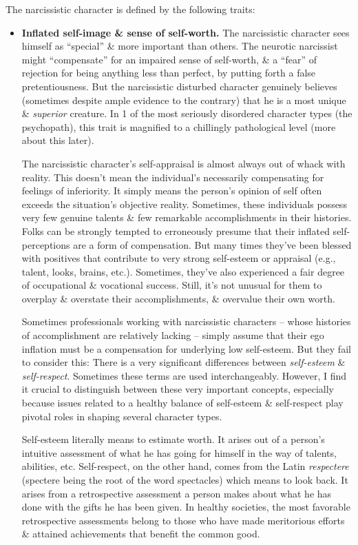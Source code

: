 \documentclass{article}
\numberwithin{equation}{section}
\begin{document}
The narcissistic character is defined by the following traits:
\begin{itemize}
	\item \textbf{Inflated self-image \& sense of self-worth.} The narcissistic character sees himself as ``special'' \& more important than others. The neurotic narcissist might ``compensate'' for an impaired sense of self-worth, \& a ``fear'' of rejection for being anything less than perfect, by putting forth a false pretentiousness. But the narcissistic disturbed character genuinely believes (sometimes despite ample evidence to the contrary) that he is a most unique \& \textit{superior} creature. In 1 of the most seriously disordered character types (the psychopath), this trait is magnified to a chillingly pathological level (more about this later).
	
	The narcissistic character's self-appraisal is almost always out of whack with reality. This doesn't mean the individual's necessarily compensating for feelings of inferiority. It simply means the person's opinion of self often exceeds the situation's objective reality. Sometimes, these individuals possess very few genuine talents \& few remarkable accomplishments in their histories. Folks can be strongly tempted to erroneously presume that their inflated self-perceptions are a form of compensation. But many times they've been blessed with positives that contribute to very strong self-esteem or appraisal (e.g., talent, looks, brains, etc.). Sometimes, they've also experienced a fair degree of occupational \& vocational success. Still, it's not unusual for them to overplay \& overstate their accomplishments, \& overvalue their own worth.
	
	Sometimes professionals working with narcissistic characters -- whose histories of accomplishment are relatively lacking -- simply assume that their ego inflation must be a compensation for underlying low self-esteem. But they fail to consider this: There is a very significant differences between \textit{self-esteem} \& \textit{self-respect}. Sometimes these terms are used interchangeably. However, I find it crucial to distinguish between these very important concepts, especially because issues related to a healthy balance of self-esteem \& self-respect play pivotal roles in shaping several character types.
	
	Self-esteem literally means to estimate worth. It arises out of a person's intuitive assessment of what he has going for himself in the way of talents, abilities, etc. Self-respect, on the other hand, comes from the Latin \textit{respectere} (spectere being the root of the word spectacles) which means to look back. It arises from a retrospective assessment a person makes about what he has done with the gifts he has been given. In healthy societies, the most favorable retrospective assessments belong to those who have made meritorious efforts \& attained achievements that benefit the common good.
	

\end{itemize}
\end{document}
